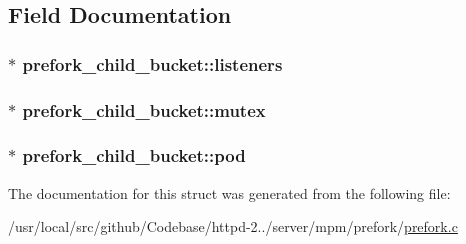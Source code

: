 \subsection{Field Documentation}
\subsubsection[{\texorpdfstring{listeners}{listeners}}]{$\ast$ prefork\+\_\+child\+\_\+bucket\+::listeners}\hypertarget{structprefork__child__bucket_adfa2241ac0874c6e8c5007418bc91705}{}\label{structprefork__child__bucket_adfa2241ac0874c6e8c5007418bc91705}
\subsubsection[{\texorpdfstring{mutex}{mutex}}]{$\ast$ prefork\+\_\+child\+\_\+bucket\+::mutex}\hypertarget{structprefork__child__bucket_a8e2510a7f731c116aac1c22b3c80b35a}{}\label{structprefork__child__bucket_a8e2510a7f731c116aac1c22b3c80b35a}
\subsubsection[{\texorpdfstring{pod}{pod}}]{$\ast$ prefork\+\_\+child\+\_\+bucket\+::pod}\hypertarget{structprefork__child__bucket_aba326826c7fe4ad6a6869e087139afcc}{}\label{structprefork__child__bucket_aba326826c7fe4ad6a6869e087139afcc}


The documentation for this struct was generated from the following file\+:\begin{DoxyCompactItemize}
\item 
/usr/local/src/github/\+Codebase/httpd-\/2../server/mpm/prefork/\hyperlink{prefork_8c}{prefork.\+c}\end{DoxyCompactItemize}
